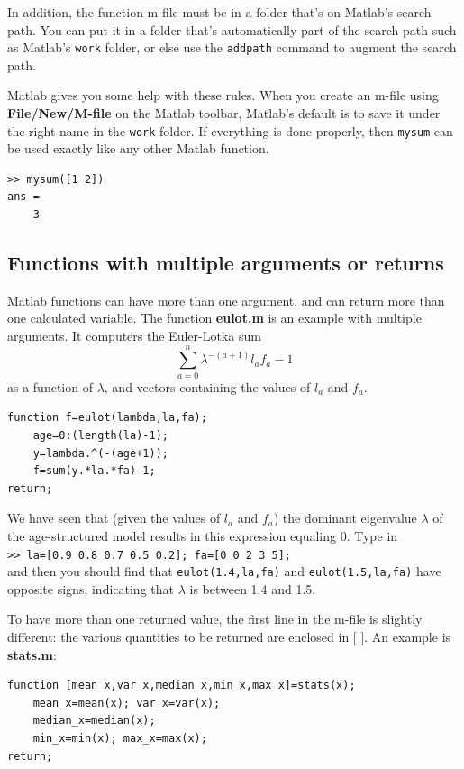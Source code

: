 \documentclass [11pt]{article}
\newcommand{\ttt}[1]{\texttt{#1}}
\newcommand{\tab}{\hspace*{0.5in}}
\numberwithin{exercise}{section}
\begin{document}
In addition, the function m-file must be in a folder that's on Matlab's 
search path. You can put it in a folder that's automatically part of the 
search path such as Matlab's \texttt{work} folder, or else use the 
\texttt{addpath} command to augment the search path. 

Matlab gives you some help with these rules. When you create an m-file using 
\textbf{File/New/M-file} on the Matlab toolbar, Matlab's default is to save 
it under the right name in the \texttt{work} folder. If everything is done 
properly, then \texttt{mysum} can be used exactly like any other Matlab 
function. 
\begin{verbatim}
>> mysum([1 2])
ans =
	3
\end{verbatim} 

\subsection{Functions with multiple arguments or returns}
Matlab functions can have more than one argument, and can return more than one calculated 
variable. The function \textbf{eulot.m} is an example with multiple arguments. It computers the 
Euler-Lotka sum $$\sum\limits_{a=0}^n {\lambda ^{-(a+1)}l_a f_a -1}$$ as a 
function of $\lambda$, and vectors containing the values of $l_a$ and $f_a.$ 
\begin{verbatim}
function f=eulot(lambda,la,fa);
    age=0:(length(la)-1);
    y=lambda.^(-(age+1));
    f=sum(y.*la.*fa)-1;
return;
\end{verbatim} 
We have seen that (given the values of $l_a$ and $f_a$) the dominant 
eigenvalue $\lambda$ of the age-structured model results in this expression 
equaling 0. Type in \\
\tab \ttt{>> la=[0.9 0.8 0.7 0.5 0.2]; fa=[0 0 2 3 5];} \\
and then you should find that \texttt{eulot(1.4,la,fa)} and 
\texttt{eulot(1.5,la,fa)} have opposite signs, indicating that $\lambda$ is 
between 1.4 and 1.5. 

To have more than one returned value, the first line in the m-file is slightly different: 
the various quantities to be returned are enclosed in [ ]. An example is 
\textbf{stats.m}: 
\begin{verbatim}
function [mean_x,var_x,median_x,min_x,max_x]=stats(x); 
    mean_x=mean(x); var_x=var(x); 
    median_x=median(x);
    min_x=min(x); max_x=max(x);
return;
\end{verbatim} 
\end{document}
